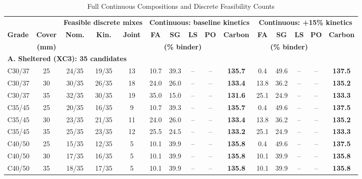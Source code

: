 \documentclass[journal]{IEEEtran}
\begin{document}
\begin{table}[!h]
\caption{Full Continuous Compositions and Discrete Feasibility Counts}
\label{tab:candidates_details}
\centering
\footnotesize
\renewcommand{\arraystretch}{1.15}
\setlength{\tabcolsep}{2.5pt}
\begin{tabular*}{\textwidth}{@{\extracolsep{\fill}}lc ccc ccccc ccccc@{}}
\toprule
& & \multicolumn{3}{c}{\textbf{Feasible discrete mixes}} & \multicolumn{5}{c}{\textbf{Continuous: baseline kinetics}} & \multicolumn{5}{c}{\textbf{Continuous: +15\% kinetics}} \\
\cmidrule(lr){3-5}\cmidrule(lr){6-10}\cmidrule(lr){11-15}
\textbf{Grade} & \textbf{Cover} & \textbf{Nom.} & \textbf{Kin.} & \textbf{Joint} & \textbf{FA} & \textbf{SG} & \textbf{LS} & \textbf{PO} & \textbf{Carbon} & \textbf{FA} & \textbf{SG} & \textbf{LS} & \textbf{PO} & \textbf{Carbon} \\
& \textbf{(mm)} & & & & \multicolumn{4}{c}{\textbf{(\% binder)}} & & \multicolumn{4}{c}{\textbf{(\% binder)}} & \\
\midrule
\multicolumn{15}{l}{\textbf{A. Sheltered (XC3): 35 candidates}} \\
C30/37 & 25 & 24/35 & 19/35 & 13 & 10.7 & 39.3 & -- & -- & \textbf{135.7} & 0.4 & 49.6 & -- & -- & \textbf{137.5} \\
C30/37 & 30 & 30/35 & 26/35 & 18 & 24.0 & 26.0 & -- & -- & \textbf{133.4} & 13.8 & 36.2 & -- & -- & \textbf{135.2} \\
C30/37 & 35 & 32/35 & 30/35 & 19 & 35.0 & 15.0 & -- & -- & \textbf{131.6} & 25.1 & 24.9 & -- & -- & \textbf{133.3} \\
\addlinespace[2pt]
C35/45 & 25 & 20/35 & 16/35 & 9 & 10.7 & 39.3 & -- & -- & \textbf{135.7} & 0.4 & 49.6 & -- & -- & \textbf{137.5} \\
C35/45 & 30 & 23/35 & 21/35 & 11 & 24.0 & 26.0 & -- & -- & \textbf{133.4} & 13.8 & 36.2 & -- & -- & \textbf{135.2} \\
C35/45 & 35 & 25/35 & 23/35 & 12 & 25.5 & 24.5 & -- & -- & \textbf{133.2} & 25.1 & 24.9 & -- & -- & \textbf{133.3} \\
\addlinespace[2pt]
C40/50 & 25 & 15/35 & 12/35 & 5 & 10.1 & 39.9 & -- & -- & \textbf{135.8} & 0.4 & 49.6 & -- & -- & \textbf{137.5} \\
C40/50 & 30 & 17/35 & 16/35 & 5 & 10.1 & 39.9 & -- & -- & \textbf{135.8} & 10.1 & 39.9 & -- & -- & \textbf{135.8} \\
C40/50 & 35 & 18/35 & 17/35 & 5 & 10.1 & 39.9 & -- & -- & \textbf{135.8} & 10.1 & 39.9 & -- & -- & \textbf{135.8} \\

\end{tabular*}
\end{table}
\end{document}
